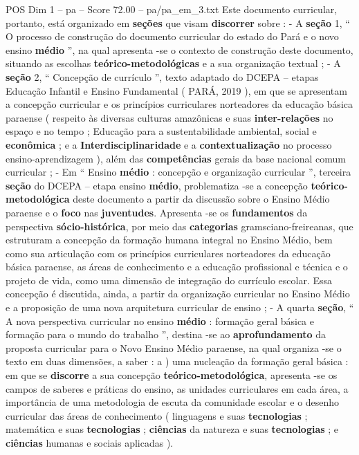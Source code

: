 \begin{textsample}{POS Dim 1 – pa – Score 72.00 – pa/pa\_em\_3.txt}
Este documento curricular, portanto, está organizado em \textbf{seções} que visam \textbf{discorrer} sobre : - A \textbf{seção} 1, “ O processo de construção do documento curricular do estado do Pará e o novo ensino \textbf{médio} ”, na qual apresenta -se o contexto de construção deste documento, situando as escolhas \textbf{teórico-metodológicas} e a sua organização textual ; - A \textbf{seção} 2, “ Concepção de currículo ”, texto adaptado do DCEPA – etapas Educação Infantil e Ensino Fundamental ( PARÁ, 2019 ), em que se apresentam a concepção curricular e os princípios curriculares norteadores da educação básica paraense ( respeito às diversas culturas amazônicas e suas \textbf{inter-relações} no espaço e no tempo ; Educação para a sustentabilidade ambiental, social e \textbf{econômica} ; e a \textbf{Interdisciplinaridade} e a \textbf{contextualização} no processo ensino-aprendizagem ), além das \textbf{competências} gerais da base nacional comum curricular ; - Em “ Ensino \textbf{médio} : concepção e organização curricular ”, terceira \textbf{seção} do DCEPA – etapa ensino \textbf{médio}, problematiza -se a concepção \textbf{teórico-metodológica} deste documento a partir da discussão sobre o Ensino Médio paraense e o \textbf{foco} nas \textbf{juventudes}.
Apresenta -se os \textbf{fundamentos} da perspectiva \textbf{sócio-histórica}, por meio das \textbf{categorias} gramsciano-freireanas, que estruturam a concepção da formação humana integral no Ensino Médio, bem como sua articulação com os princípios curriculares norteadores da educação básica paraense, as áreas de conhecimento e a educação profissional e técnica e o projeto de vida, como uma dimensão de integração do currículo escolar.
Essa concepção é discutida, ainda, a partir da organização curricular no Ensino Médio e a proposição de uma nova arquitetura curricular de ensino ; - A quarta \textbf{seção}, “ A nova perspectiva curricular no ensino \textbf{médio} : formação geral básica e formação para o mundo do trabalho ”, destina -se ao \textbf{aprofundamento} da proposta curricular para o Novo Ensino Médio paraense, na qual organiza -se o texto em duas dimensões, a saber : a ) uma nucleação da formação geral básica : em que se \textbf{discorre} a sua concepção \textbf{teórico-metodológica}, apresenta -se os campos de saberes e práticas do ensino, as unidades curriculares em cada área, a importância de uma metodologia de escuta da comunidade escolar e o desenho curricular das áreas de conhecimento ( linguagens e suas \textbf{tecnologias} ; matemática e suas \textbf{tecnologias} ; \textbf{ciências} da natureza e suas \textbf{tecnologias} ; e \textbf{ciências} humanas e sociais aplicadas ).

\end{textsample}
